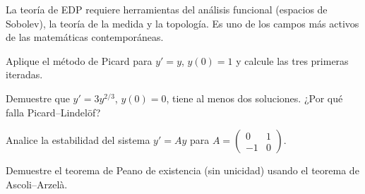 La teoría de EDP requiere herramientas del análisis funcional (espacios de Sobolev), la teoría de la medida y la topología. Es uno de los campos más activos de las matemáticas contemporáneas.

\begin{exercise}
Aplique el método de Picard para $y'=y$, $y(0)=1$ y calcule las tres primeras iteradas.
\end{exercise}

\begin{exercise}
Demuestre que $y'=3y^{2/3}$, $y(0)=0$, tiene al menos dos soluciones. ¿Por qué falla Picard--Lindelöf?
\end{exercise}

\begin{exercise}
Analice la estabilidad del sistema $y'=Ay$ para $A=\begin{pmatrix}0&1\\-1&0\end{pmatrix}$.
\end{exercise}

\begin{problem}
Demuestre el teorema de Peano de existencia (sin unicidad) usando el teorema de Ascoli--Arzelà.
\end{problem}
